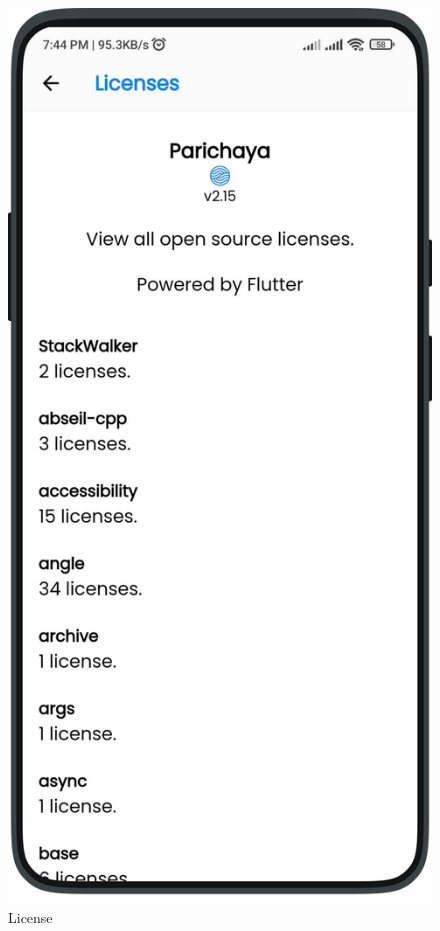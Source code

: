 \begin{multicols}{3}
\begin{figure}[H]
            \centering
            \includegraphics[width=0.85\linewidth]{images/results/mobile/OpenSourceLicenses.png}
            \caption[License]{License}
            \label{fig:OpenSourceLicenses.png}
            \end{figure}
        
        \end{multicols}

